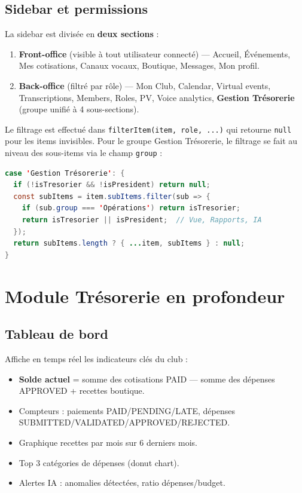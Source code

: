 \documentclass[11pt,a4paper]{report}
\begin{document}
\section{Sidebar et permissions}

La sidebar est divisée en \textbf{deux sections} :
\begin{enumerate}
  \item \textbf{Front-office} (visible à tout utilisateur connecté) — Accueil,
        Événements, Mes cotisations, Canaux vocaux, Boutique, Messages, Mon
        profil.
  \item \textbf{Back-office} (filtré par rôle) — Mon Club, Calendar, Virtual
        events, Transcriptions, Members, Roles, PV, Voice analytics,
        \textbf{Gestion Trésorerie} (groupe unifié à 4 sous-sections).
\end{enumerate}

Le filtrage est effectué dans \texttt{filterItem(item, role, ...)} qui retourne
\texttt{null} pour les items invisibles. Pour le groupe \og Gestion Trésorerie\fg,
le filtrage se fait au niveau des sous-items via le champ \texttt{group} :

\begin{lstlisting}[language=java]
case 'Gestion Trésorerie': {
  if (!isTresorier && !isPresident) return null;
  const subItems = item.subItems.filter(sub => {
    if (sub.group === 'Opérations') return isTresorier;
    return isTresorier || isPresident;  // Vue, Rapports, IA
  });
  return subItems.length ? { ...item, subItems } : null;
}
\end{lstlisting}


\chapter{Module Trésorerie en profondeur}

\section{Tableau de bord}

Affiche en temps réel les indicateurs clés du club :
\begin{itemize}
  \item \textbf{Solde actuel} = somme des cotisations PAID — somme des dépenses
        APPROVED + recettes boutique.
  \item Compteurs : paiements PAID/PENDING/LATE, dépenses
        SUBMITTED/VALIDATED/APPROVED/REJECTED.
  \item Graphique \og recettes par mois \fg sur 6 derniers mois.
  \item Top 3 catégories de dépenses (donut chart).
  \item Alertes IA : anomalies détectées, ratio dépenses/budget.
\end{itemize}
\end{document}
